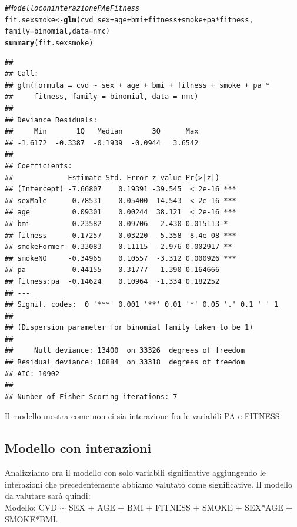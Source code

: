\documentclass{article}\usepackage[]{graphicx}\usepackage[]{xcolor}
\makeatletter
\newcommand{\hlcom}[1]{\textcolor[rgb]{0.678,0.584,0.686}{\textit{#1}}}%
\newcommand{\hlopt}[1]{\textcolor[rgb]{0,0,0}{#1}}%
\newcommand{\hlstd}[1]{\textcolor[rgb]{0.345,0.345,0.345}{#1}}%
\newcommand{\hlkwb}[1]{\textcolor[rgb]{0.69,0.353,0.396}{#1}}%
\newcommand{\hlkwc}[1]{\textcolor[rgb]{0.333,0.667,0.333}{#1}}%
\newcommand{\hlkwd}[1]{\textcolor[rgb]{0.737,0.353,0.396}{\textbf{#1}}}%
\newenvironment{kframe}{%
 \def\at@end@of@kframe{}%
 \ifinner\ifhmode%
  \def\at@end@of@kframe{\end{minipage}}%
  \begin{minipage}{\columnwidth}%
 \fi\fi%
 \def\FrameCommand##1{\hskip\@totalleftmargin \hskip-\fboxsep
 \colorbox{shadecolor}{##1}\hskip-\fboxsep
     \hskip-\linewidth \hskip-\@totalleftmargin \hskip\columnwidth}%
 \MakeFramed {\advance\hsize-\width
   \@totalleftmargin\z@ \linewidth\hsize
   \@setminipage}}%
 {\par\unskip\endMakeFramed%
 \at@end@of@kframe}
\newenvironment{knitrout}{}{} %
\makeatother
\begin{document}
\begin{knitrout}
\color{fgcolor}\begin{kframe}
\begin{alltt}
\hlcom{#Modello con interazione PA e Fitness}
\hlstd{fit.sexsmoke} \hlkwb{<-} \hlkwd{glm}\hlstd{(cvd}\hlopt{~}\hlstd{sex}\hlopt{+}\hlstd{age}\hlopt{+}\hlstd{bmi}\hlopt{+}\hlstd{fitness}\hlopt{+}\hlstd{smoke}\hlopt{+}\hlstd{pa}\hlopt{*}\hlstd{fitness,}
                    \hlkwc{family}\hlstd{=binomial,} \hlkwc{data}\hlstd{=nmc)}
\hlkwd{summary}\hlstd{(fit.sexsmoke)}
\end{alltt}
\begin{verbatim}
## 
## Call:
## glm(formula = cvd ~ sex + age + bmi + fitness + smoke + pa * 
##     fitness, family = binomial, data = nmc)
## 
## Deviance Residuals: 
##     Min       1Q   Median       3Q      Max  
## -1.6172  -0.3387  -0.1939  -0.0944   3.6542  
## 
## Coefficients:
##             Estimate Std. Error z value Pr(>|z|)    
## (Intercept) -7.66807    0.19391 -39.545  < 2e-16 ***
## sexMale      0.78531    0.05400  14.543  < 2e-16 ***
## age          0.09301    0.00244  38.121  < 2e-16 ***
## bmi          0.23582    0.09706   2.430 0.015113 *  
## fitness     -0.17257    0.03220  -5.358  8.4e-08 ***
## smokeFormer -0.33083    0.11115  -2.976 0.002917 ** 
## smokeNO     -0.34965    0.10557  -3.312 0.000926 ***
## pa           0.44155    0.31777   1.390 0.164666    
## fitness:pa  -0.14624    0.10964  -1.334 0.182252    
## ---
## Signif. codes:  0 '***' 0.001 '**' 0.01 '*' 0.05 '.' 0.1 ' ' 1
## 
## (Dispersion parameter for binomial family taken to be 1)
## 
##     Null deviance: 13400  on 33326  degrees of freedom
## Residual deviance: 10884  on 33318  degrees of freedom
## AIC: 10902
## 
## Number of Fisher Scoring iterations: 7
\end{verbatim}
\end{kframe}
\end{knitrout}
    
    Il modello mostra come non ci sia interazione fra le variabili PA e FITNESS.
  
  \clearpage
  
  \subsection{Modello con interazioni}
    Analizziamo ora il modello con solo variabili significative aggiungendo
    le interazioni che precedentemente abbiamo valutato come significative.
    Il modello da valutare sarà quindi:\\
    Modello: CVD $\sim$ SEX + AGE + BMI + FITNESS + SMOKE + SEX*AGE + SMOKE*BMI.
    
\end{document}
